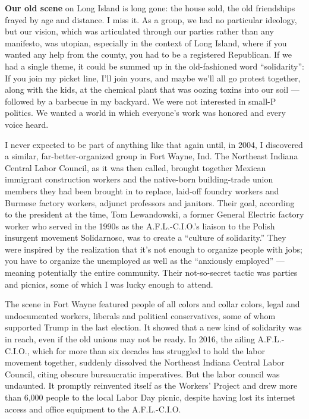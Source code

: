 \textbf{Our old scene} on Long Island is long gone: the house sold, the
old friendships frayed by age and distance. I miss it. As a group, we
had no particular ideology, but our vision, which was articulated
through our parties rather than any manifesto, was utopian, especially
in the context of Long Island, where if you wanted any help from the
county, you had to be a registered Republican. If we had a single theme,
it could be summed up in the old-fashioned word ``solidarity'': If you
join my picket line, I'll join yours, and maybe we'll all go protest
together, along with the kids, at the chemical plant that was oozing
toxins into our soil --- followed by a barbecue in my backyard. We were
not interested in small-P politics. We wanted a world in which
everyone's work was honored and every voice heard.

I never expected to be part of anything like that again until, in 2004,
I discovered a similar, far-better-organized group in Fort Wayne, Ind.
The Northeast Indiana Central Labor Council, as it was then called,
brought together Mexican immigrant construction workers and the
native-born building-trade union members they had been brought in to
replace, laid-off foundry workers and Burmese factory workers, adjunct
professors and janitors. Their goal, according to the president at the
time, Tom Lewandowski, a former General Electric factory worker who
served in the 1990s as the A.F.L.-C.I.O.'s liaison to the Polish
insurgent movement Solidarnosc, was to create a ``culture of
solidarity.'' They were inspired by the realization that it's not enough
to organize people with jobs; you have to organize the unemployed as
well as the ``anxiously employed'' --- meaning potentially the entire
community. Their not-so-secret tactic was parties and picnics, some of
which I was lucky enough to attend.

The scene in Fort Wayne featured people of all colors and collar colors,
legal and undocumented workers, liberals and political conservatives,
some of whom supported Trump in the last election. It showed that a new
kind of solidarity was in reach, even if the old unions may not be
ready. In 2016, the ailing A.F.L.-C.I.O., which for more than six
decades has struggled to hold the labor movement together, suddenly
dissolved the Northeast Indiana Central Labor Council, citing obscure
bureaucratic imperatives. But the labor council was undaunted. It
promptly reinvented itself as the Workers' Project and drew more than
6,000 people to the local Labor Day picnic, despite having lost its
internet access and office equipment to the A.F.L.-C.I.O.

